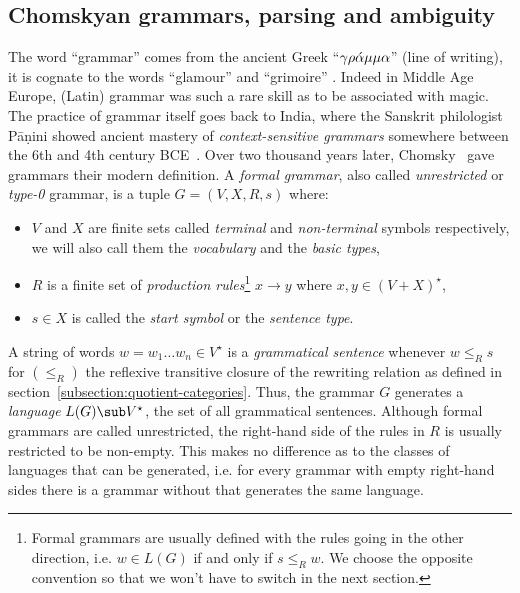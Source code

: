 
\subsection{Chomskyan grammars, parsing and ambiguity}\label{subsection:chomsky}

The word ``grammar'' comes from the ancient Greek ``$\rm{\gamma \rho\acute{\alpha}\mu\mu\alpha}$'' (line of writing), it is cognate to the words ``glamour'' and ``grimoire'' \cite{RuppliThorel05, Davies10, Lambek14}.
Indeed in Middle Age Europe, (Latin) grammar was such a rare skill as to be associated with magic.
The practice of grammar itself goes back to India, where the Sanskrit philologist P\={a}\d{n}ini showed ancient mastery of \emph{context-sensitive grammars} somewhere between the 6th and 4th century BCE~\cite{BhateKak93}.
Over two thousand years later, Chomsky~\cite{Chomsky56,Chomsky57} gave grammars their modern definition.
A \emph{formal grammar}, also called \emph{unrestricted} or \emph{type-0} grammar, is a tuple $G = (V, X, R, s)$ where:
\begin{itemize}
    \item $V$ and $X$ are finite sets called \emph{terminal} and \emph{non-terminal} symbols respectively, we will also call them the \emph{vocabulary} and the \emph{basic types},
    \item $R$ is a finite set of \emph{production rules}\footnote
    {Formal grammars are usually defined with the rules going in the other direction, i.e. $w \in L(G)$ if and only if $s \leq_R w$.
    We choose the opposite convention so that we won't have to switch in the next section.} $x \to y$ where $x, y \in (V + X)^\star$,
    \item $s \in X$ is called the \emph{start symbol} or the \emph{sentence type}.
\end{itemize}
A string of words $w = w_1 \dots w_n \in V^\star$ is a \emph{grammatical sentence} whenever $w \leq_R s$
for $(\leq_R)$ the reflexive transitive closure of the rewriting relation as defined in section~\ref{subsection:quotient-categories}.
Thus, the grammar $G$ generates a \emph{language} $L(G) \sub V^\star$, the set of all grammatical sentences.
Although formal grammars are called unrestricted, the right-hand side of the rules in $R$ is usually restricted to be non-empty.
This makes no difference as to the classes of languages that can be generated, i.e. for every grammar with empty right-hand sides there is a grammar without that generates the same language.

